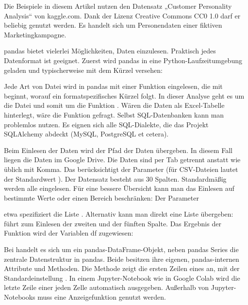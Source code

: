 Die Beispiele in diesem Artikel nutzen den Datensatz „Customer Personality Analysis“ von kaggle.com. Dank der Lizenz Creative Commons CC0 1.0 darf er beliebig genutzt werden. Es handelt sich um Personendaten einer fiktiven Marketingkampagne.

pandas bietet vielerlei Möglichkeiten, Daten einzulesen. Praktisch jedes Datenformat ist geeignet. Zuerst wird pandas in eine Python-Laufzeitumgebung geladen und typischerweise mit dem Kürzel  versehen:

\medskip


\medskip

Jede Art von Datei wird in pandas mit einer Funktion eingelesen, die mit  beginnt, worauf ein formatspezifisches Kürzel folgt. In dieser Analyse geht es um die Datei  und somit um die Funktion . Wären die Daten als Excel-Tabelle hinterlegt, wäre die Funktion  gefragt. Selbst SQL-Datenbanken kann man problemlos nutzen. Es eignen sich alle SQL-Dialekte, die das Projekt SQLAlchemy abdeckt (MySQL, PostgreSQL et cetera).

Beim Einlesen der Daten wird  der Pfad der Daten übergeben. In diesem Fall liegen die Daten im Google Drive. Die Daten sind per Tab getrennt anstatt wie üblich mit Komma. Das berücksichtigt der Parameter  (für CSV-Dateien lautet der Standardwert ). Der Datensatz besteht aus 30 Spalten. Standardmäßig werden alle eingelesen. Für eine bessere Übersicht kann man das Einlesen auf bestimmte Werte oder einen Bereich beschränken: Der Parameter

\medskip


\medskip

etwa spezifiziert die Liste \PYTHON{[0,1,2,3,4,5,6,7]}. Alternativ kann man direkt eine Liste übergeben: \PYTHON{[1,4]} führt zum Einlesen der zweiten und der fünften Spalte. Das Ergebnis der Funktion  wird der Variablen df zugewiesen:

\medskip


\medskip


Bei  handelt es sich um ein pandas-DataFrame-Objekt, neben pandas Series die zentrale Datenstruktur in pandas. Beide besitzen ihre eigenen, pandas-internen Attribute und Methoden. Die Methode  zeigt die ersten  Zeilen eines  an, mit der Standardeinstellung . In einem Jupyter-Notebook wie in Google Colab wird die letzte Zeile einer jeden Zelle automatisch ausgegeben. Außerhalb von Jupyter-Notebooks muss eine Anzeigefunktion genutzt werden.

